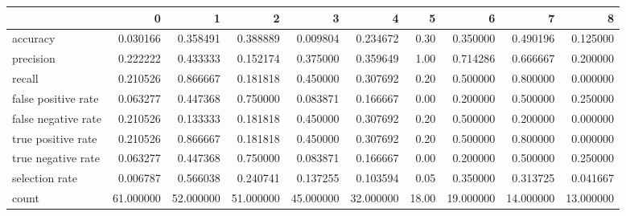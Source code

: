 \begin{tabular}{lrrrrrrrrr}
\toprule
{} &          0 &          1 &          2 &          3 &          4 &      5 &          6 &          7 &          8 \\
\midrule
accuracy            &   0.030166 &   0.358491 &   0.388889 &   0.009804 &   0.234672 &   0.30 &   0.350000 &   0.490196 &   0.125000 \\
precision           &   0.222222 &   0.433333 &   0.152174 &   0.375000 &   0.359649 &   1.00 &   0.714286 &   0.666667 &   0.200000 \\
recall              &   0.210526 &   0.866667 &   0.181818 &   0.450000 &   0.307692 &   0.20 &   0.500000 &   0.800000 &   0.000000 \\
false positive rate &   0.063277 &   0.447368 &   0.750000 &   0.083871 &   0.166667 &   0.00 &   0.200000 &   0.500000 &   0.250000 \\
false negative rate &   0.210526 &   0.133333 &   0.181818 &   0.450000 &   0.307692 &   0.20 &   0.500000 &   0.200000 &   0.000000 \\
true positive rate  &   0.210526 &   0.866667 &   0.181818 &   0.450000 &   0.307692 &   0.20 &   0.500000 &   0.800000 &   0.000000 \\
true negative rate  &   0.063277 &   0.447368 &   0.750000 &   0.083871 &   0.166667 &   0.00 &   0.200000 &   0.500000 &   0.250000 \\
selection rate      &   0.006787 &   0.566038 &   0.240741 &   0.137255 &   0.103594 &   0.05 &   0.350000 &   0.313725 &   0.041667 \\
count               &  61.000000 &  52.000000 &  51.000000 &  45.000000 &  32.000000 &  18.00 &  19.000000 &  14.000000 &  13.000000 \\
\bottomrule
\end{tabular}
